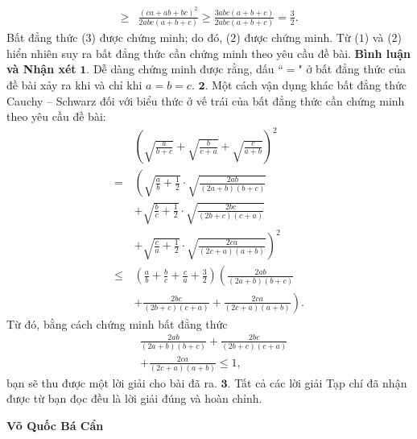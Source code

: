 \begin{multicols}{2}
\begin{align*}
			 \ge &\frac{{{{\left( {ca + ab + bc} \right)}^2}}}{{2abc\left( {a + b + c} \right)}} \ge \frac{{3abc\left( {a \!+\! b \!+\! c} \right)}}{{2abc\left( {a \!+\! b \!+\! c} \right)}} = \frac{3}{2}.
	\end{align*}
	Bất đẳng thức ($3$) được chứng minh; do đó, ($2$) được chứng minh.
	\vskip 0.05cm
	Từ ($1$) và ($2$) hiển nhiên suy ra bất đẳng thức cần chứng minh theo yêu cầu đề bài.
	\vskip 0.05cm
	\textbf{\color{thachthuctoanhoc}Bình luận và Nhận xét}
	\vskip 0.05cm
	$\pmb{1.}$ Dễ dàng chứng minh được rằng, dấu ``$=$" ở bất đẳng thức của đề bài xảy ra khi và chỉ khi $a = b = c$.
	\vskip 0.05cm
	$\pmb{2.}$ Một cách vận dụng khác bất đẳng thức Cauchy -- Schwarz đối với biểu thức ở vế trái của bất đẳng thức cần chứng minh theo yêu cầu đề bài:
	\begin{align*}
			&{\left( {\sqrt {\frac{a}{{b + c}}}  + \sqrt {\frac{b}{{c + a}}}  + \sqrt {\frac{c}{{a + b}}} } \right)^2}\\
			=\, &\left( \sqrt {\frac{a}{b} + \frac{1}{2}}  \cdot \sqrt {\frac{{2ab}}{{\left( {2a + b} \right)\left( {b + c} \right)}}}\right.  \\
				&+ \sqrt {\frac{b}{c} + \frac{1}{2}}  \cdot \sqrt {\frac{{2bc}}{{\left( {2b + c} \right)\left( {c + a} \right)}}}\\
				&\left.+ \sqrt {\frac{c}{a} + \frac{1}{2}}  \cdot \sqrt {\frac{{2ca}}{{\left( {2c + a} \right)\left( {a + b} \right)}}}  \right)^2\\
			\le &\left( {\frac{a}{b} + \frac{b}{c} + \frac{c}{a} + \frac{3}{2}} \right)\left( \frac{{2ab}}{{\left( {2a + b} \right)\left( {b + c} \right)}}\right. \\
				&\left.+ \frac{{2bc}}{{\left( {2b + c} \right)\left( {c + a} \right)}} + \frac{{2ca}}{{\left( {2c + a} \right)\left( {a + b} \right)}} \right).
	\end{align*}
	Từ đó, bằng cách chứng minh bất đẳng thức
	\begin{align*}
		&\frac{{2ab}}{{\left( {2a + b} \right)\left( {b + c} \right)}} + \frac{{2bc}}{{\left( {2b + c} \right)\left( {c + a} \right)}} \\
		&+ \frac{{2ca}}{{\left( {2c + a} \right)\left( {a + b} \right)}} \le 1,
	\end{align*}
	bạn sẽ thu được một lời giải cho bài đã ra.
	\vskip 0.05cm
	$\pmb{3.}$ Tất cả các lời giải Tạp chí đã nhận được từ bạn đọc đều là lời giải đúng và hoàn chỉnh.
	\begin{flushright}
		\textbf{\color{thachthuctoanhoc}Võ Quốc Bá Cẩn}
	\end{flushright}

\end{multicols}
